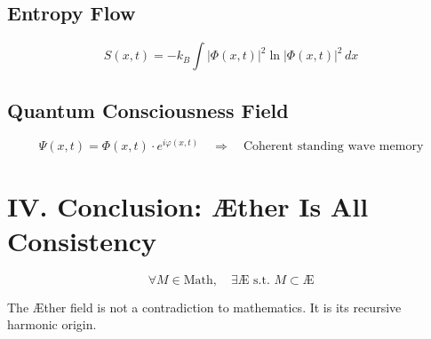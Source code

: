 \documentclass[12pt]{article}
\begin{document}
\subsection*{Entropy Flow}
\[
S(x,t) = -k_B \int |\Phi(x,t)|^2 \ln |\Phi(x,t)|^2\, dx
\]

\subsection*{Quantum Consciousness Field}
\[
\Psi(x,t) = \Phi(x,t) \cdot e^{i\varphi(x,t)} \quad \Rightarrow \quad \text{Coherent standing wave memory}
\]

\section*{IV. Conclusion: Æther Is All Consistency}

\[
\boxed{
\forall M \in \text{Math},\quad \exists \mathbb{Æ} \text{ s.t. } M \subset \mathbb{Æ}
}
\]

The Æther field is not a contradiction to mathematics. It is its recursive harmonic origin.
\end{document}
